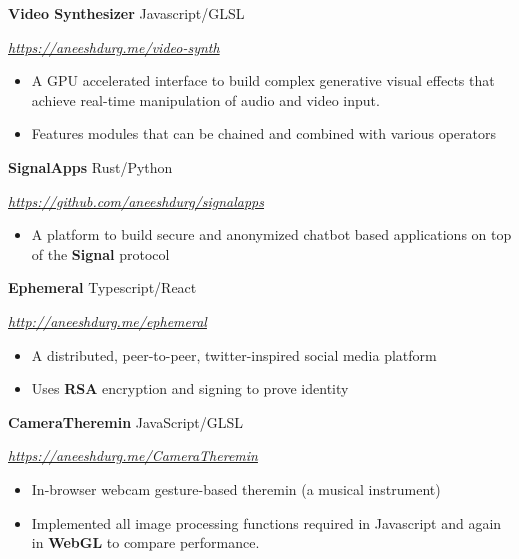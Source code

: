 \documentclass[paper=a4,fontsize=11pt]{scrartcl} %
\newcommand{\EducationEntry}[4]{
		\noindent \textbf{#1}     %
			\hfill#2 \par  %
		\noindent \textit{#3} \par        %
		\noindent\hangafter=0 \small #4 %
		\normalsize \par}
\begin{document}
\EducationEntry{Video Synthesizer}{Javascript/GLSL}{\url{https://aneeshdurg.me/video-synth}}{
\begin{itemize}
\item A GPU accelerated interface to build complex generative visual effects that achieve real-time manipulation of audio and video input.
\item Features modules that can be chained and combined with various operators
\end{itemize}
}

\EducationEntry{SignalApps}{Rust/Python}{\url{https://github.com/aneeshdurg/signalapps}} {
\begin{itemize}
  \item A platform to build secure and anonymized chatbot based applications on top of the \textbf{Signal} protocol
\end{itemize}

}

\EducationEntry{Ephemeral}{Typescript/React}{\url{http://aneeshdurg.me/ephemeral}}{
\begin{itemize}
\item A distributed, peer-to-peer, twitter-inspired social media platform
\item Uses \textbf{RSA} encryption and signing to prove identity
\end{itemize}
}

\EducationEntry{CameraTheremin}{JavaScript/GLSL}{\url{https://aneeshdurg.me/CameraTheremin}}{
\begin{itemize}
\item In-browser webcam gesture-based theremin (a musical instrument)
\item Implemented all image processing functions required in Javascript and again in \textbf{WebGL} to compare performance.
\end{itemize}
}
\end{document}
